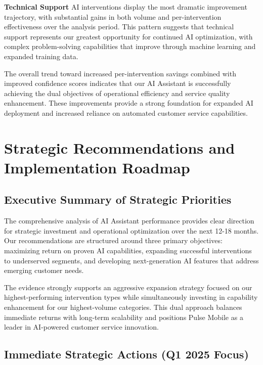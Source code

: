 \documentclass[
  letterpaper,
  DIV=11,
  numbers=noendperiod]{scrartcl}
\begin{document}
\textbf{Technical Support} AI interventions display the most dramatic
improvement trajectory, with substantial gains in both volume and
per-intervention effectiveness over the analysis period. This pattern
suggests that technical support represents our greatest opportunity for
continued AI optimization, with complex problem-solving capabilities
that improve through machine learning and expanded training data.

The overall trend toward increased per-intervention savings combined
with improved confidence scores indicates that our AI Assistant is
successfully achieving the dual objectives of operational efficiency and
service quality enhancement. These improvements provide a strong
foundation for expanded AI deployment and increased reliance on
automated customer service capabilities.

\section{Strategic Recommendations and Implementation
Roadmap}\label{strategic-recommendations-and-implementation-roadmap}

\subsection{Executive Summary of Strategic
Priorities}\label{executive-summary-of-strategic-priorities}

The comprehensive analysis of AI Assistant performance provides clear
direction for strategic investment and operational optimization over the
next 12-18 months. Our recommendations are structured around three
primary objectives: maximizing return on proven AI capabilities,
expanding successful interventions to underserved segments, and
developing next-generation AI features that address emerging customer
needs.

The evidence strongly supports an aggressive expansion strategy focused
on our highest-performing intervention types while simultaneously
investing in capability enhancement for our highest-volume categories.
This dual approach balances immediate returns with long-term scalability
and positions Pulse Mobile as a leader in AI-powered customer service
innovation.

\subsection{Immediate Strategic Actions (Q1 2025
Focus)}\label{immediate-strategic-actions-q1-2025-focus}
\end{document}
